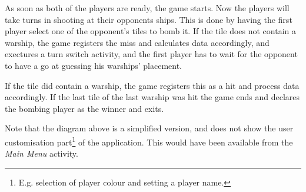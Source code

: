 As soon as both of the players are ready, the game starts. Now the players will take turns in shooting at their opponents ships. This is done by having the first player select one of the opponent's tiles to bomb it. If the tile does not contain a warship, the game registers the miss and calculates data accordingly, and exectures a turn switch activity, and the first player has to wait for the opponent to have a go at guessing his warships' placement.

If the tile did contain a warship, the game registers this as a hit and process data accordingly. If the last tile of the last warship was hit the game ends and declares the bombing player as the winner and exits.

Note that the diagram above is a simplified version, and does not show the user customisation part\footnote{E.g. selection of player colour and setting a player name.} of the application. This would have been available from the \emph{Main Menu} activity.

